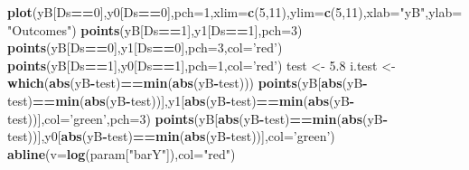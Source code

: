 \documentclass[]{book}
\newenvironment{Shaded}{\begin{snugshade}}{\end{snugshade}}
\newcommand{\DataTypeTok}[1]{\textcolor[rgb]{0.13,0.29,0.53}{#1}}
\newcommand{\DecValTok}[1]{\textcolor[rgb]{0.00,0.00,0.81}{#1}}
\newcommand{\FloatTok}[1]{\textcolor[rgb]{0.00,0.00,0.81}{#1}}
\newcommand{\KeywordTok}[1]{\textcolor[rgb]{0.13,0.29,0.53}{\textbf{#1}}}
\newcommand{\NormalTok}[1]{#1}
\newcommand{\OperatorTok}[1]{\textcolor[rgb]{0.81,0.36,0.00}{\textbf{#1}}}
\newcommand{\StringTok}[1]{\textcolor[rgb]{0.31,0.60,0.02}{#1}}
\theoremstyle{definition}
\theoremstyle{definition}
\theoremstyle{definition}
\theoremstyle{remark}
\begin{document}
\begin{Shaded}
\begin{Highlighting}[]
\KeywordTok{plot}\NormalTok{(yB[Ds}\OperatorTok{==}\DecValTok{0}\NormalTok{],y0[Ds}\OperatorTok{==}\DecValTok{0}\NormalTok{],}\DataTypeTok{pch=}\DecValTok{1}\NormalTok{,}\DataTypeTok{xlim=}\KeywordTok{c}\NormalTok{(}\DecValTok{5}\NormalTok{,}\DecValTok{11}\NormalTok{),}\DataTypeTok{ylim=}\KeywordTok{c}\NormalTok{(}\DecValTok{5}\NormalTok{,}\DecValTok{11}\NormalTok{),}\DataTypeTok{xlab=}\StringTok{"yB"}\NormalTok{,}\DataTypeTok{ylab=}\StringTok{"Outcomes"}\NormalTok{)}
\KeywordTok{points}\NormalTok{(yB[Ds}\OperatorTok{==}\DecValTok{1}\NormalTok{],y1[Ds}\OperatorTok{==}\DecValTok{1}\NormalTok{],}\DataTypeTok{pch=}\DecValTok{3}\NormalTok{)}
\KeywordTok{points}\NormalTok{(yB[Ds}\OperatorTok{==}\DecValTok{0}\NormalTok{],y1[Ds}\OperatorTok{==}\DecValTok{0}\NormalTok{],}\DataTypeTok{pch=}\DecValTok{3}\NormalTok{,}\DataTypeTok{col=}\StringTok{'red'}\NormalTok{)}
\KeywordTok{points}\NormalTok{(yB[Ds}\OperatorTok{==}\DecValTok{1}\NormalTok{],y0[Ds}\OperatorTok{==}\DecValTok{1}\NormalTok{],}\DataTypeTok{pch=}\DecValTok{1}\NormalTok{,}\DataTypeTok{col=}\StringTok{'red'}\NormalTok{)}
\NormalTok{test <-}\StringTok{ }\FloatTok{5.8}
\NormalTok{i.test <-}\StringTok{ }\KeywordTok{which}\NormalTok{(}\KeywordTok{abs}\NormalTok{(yB}\OperatorTok{-}\NormalTok{test)}\OperatorTok{==}\KeywordTok{min}\NormalTok{(}\KeywordTok{abs}\NormalTok{(yB}\OperatorTok{-}\NormalTok{test)))}
\KeywordTok{points}\NormalTok{(yB[}\KeywordTok{abs}\NormalTok{(yB}\OperatorTok{-}\NormalTok{test)}\OperatorTok{==}\KeywordTok{min}\NormalTok{(}\KeywordTok{abs}\NormalTok{(yB}\OperatorTok{-}\NormalTok{test))],y1[}\KeywordTok{abs}\NormalTok{(yB}\OperatorTok{-}\NormalTok{test)}\OperatorTok{==}\KeywordTok{min}\NormalTok{(}\KeywordTok{abs}\NormalTok{(yB}\OperatorTok{-}\NormalTok{test))],}\DataTypeTok{col=}\StringTok{'green'}\NormalTok{,}\DataTypeTok{pch=}\DecValTok{3}\NormalTok{)}
\KeywordTok{points}\NormalTok{(yB[}\KeywordTok{abs}\NormalTok{(yB}\OperatorTok{-}\NormalTok{test)}\OperatorTok{==}\KeywordTok{min}\NormalTok{(}\KeywordTok{abs}\NormalTok{(yB}\OperatorTok{-}\NormalTok{test))],y0[}\KeywordTok{abs}\NormalTok{(yB}\OperatorTok{-}\NormalTok{test)}\OperatorTok{==}\KeywordTok{min}\NormalTok{(}\KeywordTok{abs}\NormalTok{(yB}\OperatorTok{-}\NormalTok{test))],}\DataTypeTok{col=}\StringTok{'green'}\NormalTok{)}
\KeywordTok{abline}\NormalTok{(}\DataTypeTok{v=}\KeywordTok{log}\NormalTok{(param[}\StringTok{"barY"}\NormalTok{]),}\DataTypeTok{col=}\StringTok{"red"}\NormalTok{)}

\end{Highlighting}
\end{Shaded}
\end{document}
